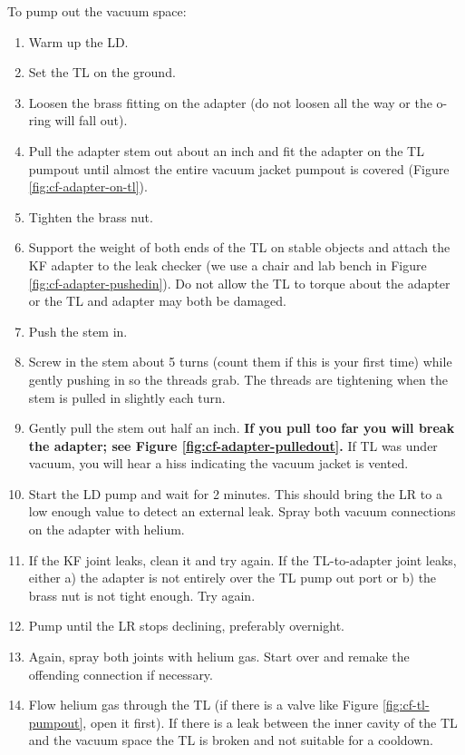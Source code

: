 To pump out the vacuum space:

\begin{enumerate}
 \item Warm up the LD.
 \item Set the TL on the ground.
 \item Loosen the brass fitting on the adapter (do not loosen all the way or the o-ring will fall out).
 \item Pull the adapter stem out about an inch and fit the adapter on the TL pumpout until almost the entire vacuum jacket pumpout is covered (Figure \ref{fig:cf-adapter-on-tl}).
 \item Tighten the brass nut.
 \item Support the weight of both ends of the TL on stable objects and attach the KF adapter to the leak checker (we use a chair and lab bench in Figure \ref{fig:cf-adapter-pushedin}).  Do not allow the TL to torque about the adapter or the TL and adapter may both be damaged.
 \item Push the stem in.
 \item Screw in the stem about 5 turns (count them if this is your first time) while gently pushing in so the threads grab.  The threads are tightening when the stem is pulled in slightly each turn.
 \item Gently pull the stem out half an inch.  \textbf{If you pull too far you will break the adapter; see Figure \ref{fig:cf-adapter-pulledout}.} If TL was under vacuum, you will hear a hiss indicating the vacuum jacket is vented.  
 \item Start the LD pump and wait for 2 minutes.  This should bring the LR to a low enough value to detect an external leak.  Spray both vacuum connections on the adapter with helium.
 \item If the KF joint leaks, clean it and try again.  If the TL-to-adapter joint leaks, either a) the adapter is not entirely over the TL pump out port or b) the brass nut is not tight enough.  Try again.
 \item Pump until the LR stops declining, preferably overnight.
 \item Again, spray both joints with helium gas.  Start over and remake the offending connection if necessary.
 \item Flow helium gas through the TL (if there is a valve like Figure \ref{fig:cf-tl-pumpout}, open it first).  If there is a leak between the inner cavity of the TL and the vacuum space the TL is broken and not suitable for a cooldown.
\end{enumerate}

